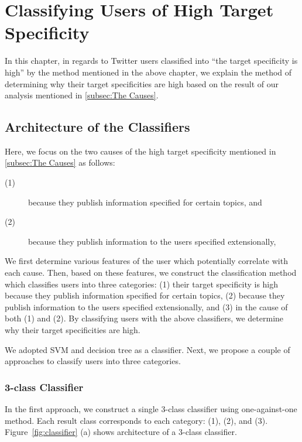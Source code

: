 \section{Classifying Users of High Target Specificity}
\label{sec:ClassificationMethod2}

In this chapter, in regards to Twitter users classified into ``the
target specificity is high'' by the method mentioned in the above
chapter, we explain the method of determining why their target
specificities are high based on the result of our analysis mentioned in
\ref{subsec:The Causes}.

\subsection{Architecture of the Classifiers}
\label{subsec:Architecture}

Here, we focus on the two causes of the high target specificity
mentioned in \ref{subsec:The Causes} as follows:
\begin{description}
 \item[(1)] because they publish information specified for certain
            topics, and
 \item[(2)] because they publish information to the users specified
            extensionally,
\end{description}


We first determine various features of the user which potentially
correlate with each cause.  Then, based on these features, we construct
the classification method which classifies users into three categories:
(1) their target specificity is high because they publish information
specified for certain topics, (2) because they publish information to
the users specified extensionally, and (3) in the cause of both (1) and
(2).  By classifying users with the above classifiers, we determine why
their target specificities are high.

We adopted SVM and decision tree as a classifier.  Next, we propose a
couple of approaches to classify users into three categories.

\subsubsection{3-class Classifier}
\label{subsubsec:3-class}

In the first approach, we construct a single 3-class classifier using
one-against-one method.  Each result class corresponds to each category:
(1), (2), and (3).  Figure~\ref{fig:classifier} (a) shows architecture
of a 3-class classifier.


